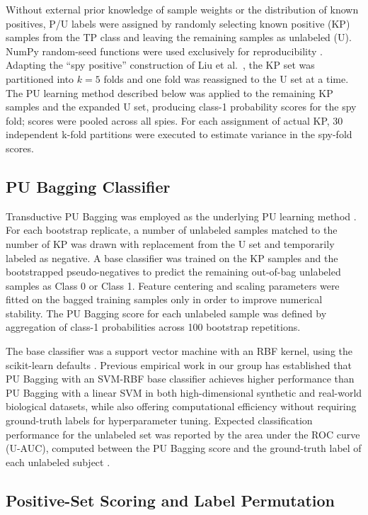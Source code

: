 \documentclass[11pt]{article}
\begin{document}
Without external prior knowledge of sample weights or the distribution of known positives, P/U labels were assigned by randomly selecting known positive (KP) samples from the TP class and leaving the remaining samples as unlabeled (U). NumPy random-seed functions were used exclusively for reproducibility \cite{harris2020numpy}. Adapting the ``spy positive'' construction of Liu et al.\ \cite{liu2003spy}, the KP set was partitioned into $k = 5$ folds and one fold was reassigned to the U set at a time. The PU learning method described below was applied to the remaining KP samples and the expanded U set, producing class-1 probability scores for the spy fold; scores were pooled across all spies. For each assignment of actual KP, 30 independent k-fold partitions were executed to estimate variance in the spy-fold scores.

\subsection{PU Bagging Classifier}

Transductive PU Bagging was employed as the underlying PU learning method \cite{mordelet2014bagging,breiman1996bagging}. For each bootstrap replicate, a number of unlabeled samples matched to the number of KP was drawn with replacement from the U set and temporarily labeled as negative. A base classifier was trained on the KP samples and the bootstrapped pseudo-negatives to predict the remaining out-of-bag unlabeled samples as Class 0 or Class 1. Feature centering and scaling parameters were fitted on the bagged training samples only in order to improve numerical stability. The PU Bagging score for each unlabeled sample was defined by aggregation of class-1 probabilities across 100 bootstrap repetitions.

The base classifier was a support vector machine with an RBF kernel, using the scikit-learn defaults \cite{pedregosa2011scikit}. Previous empirical work in our group has established that PU Bagging with an SVM-RBF base classifier achieves higher performance than PU Bagging with a linear SVM in both high-dimensional synthetic and real-world biological datasets, while also offering computational efficiency without requiring ground-truth labels for hyperparameter tuning. Expected classification performance for the unlabeled set was reported by the area under the ROC curve (U-AUC), computed between the PU Bagging score and the ground-truth label of each unlabeled subject \cite{hanley1982auc}.

\subsection{Positive-Set Scoring and Label Permutation}
\end{document}
